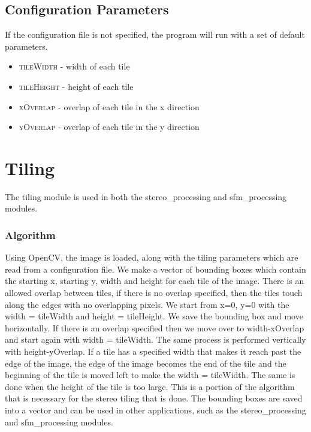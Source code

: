 \documentclass[float=false, crop=false]{standalone}
\begin{document}
\subsection{Configuration Parameters}
If the configuration file is not specified, the program will run with a set of default parameters.
\begin{itemize}
	\item{\textsc{tileWidth}} - width of each tile
	\item{\textsc{tileHeight}} - height of each tile
	\item{\textsc{xOverlap}} - overlap of each tile in the x direction
	\item{\textsc{yOverlap}} - overlap of each tile in the y direction
\end{itemize}


\section{Tiling}
The tiling module is used in both the stereo\_processing and sfm\_processing modules.
\subsubsection{Algorithm}
Using OpenCV, the image is loaded, along with the tiling parameters which are read from a configuration file. We make a vector of bounding boxes which contain the starting x, starting y, width and height for each tile of the image. There is an allowed overlap between tiles, if there is no overlap specified, then the tiles touch along the edges with no overlapping pixels. We start from x=0, y=0 with the width = tileWidth and height = tileHeight. We save the bounding box and move horizontally. If there is an overlap specified then we move over to width-xOverlap and start again with width = tileWidth. The same process is performed vertically with height-yOverlap. If a tile has a specified width that makes it reach past the edge of the image, the edge of the image becomes the end of the tile and the beginning of the tile is moved left to make the width = tileWidth. The same is done when the height of the tile is too large. This is a portion of the algorithm that is necessary for the stereo tiling that is done. The bounding boxes are saved into a vector and can be used in other applications, such as the stereo\_processing and sfm\_processing modules.
\end{document}
